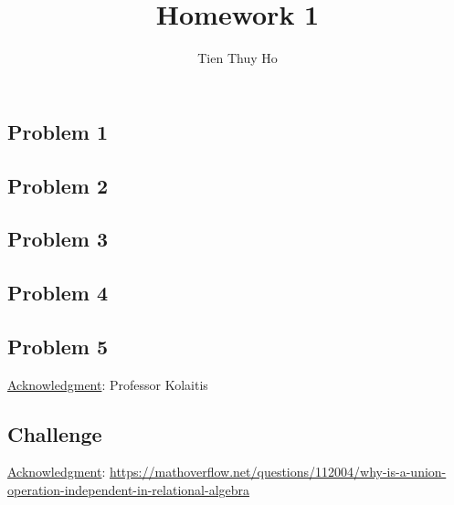 \documentclass[12 pt]{article}
\begin{document}
\title{Homework 1}
\author{Tien Thuy Ho}
\maketitle

\subsection*{Problem 1} 
\subsection*{Problem 2} 
\subsection*{Problem 3} 
\subsection*{Problem 4} 
\subsection*{Problem 5} 
\underline{Acknowledgment}: Professor Kolaitis

\subsection*{Challenge} 
\underline{Acknowledgment}: \url{https://mathoverflow.net/questions/112004/why-is-a-union-operation-independent-in-relational-algebra} \\ \\

\end{document}
